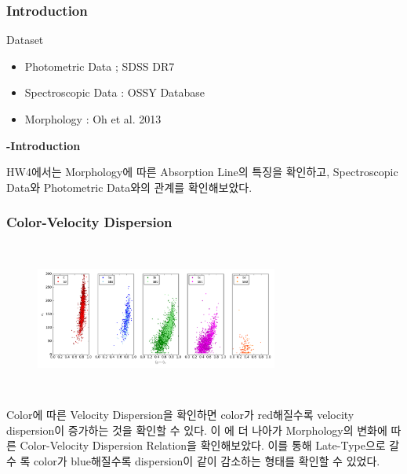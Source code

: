 \documentclass[xcolor={dvipsnames,table}]{beamer}
\newcommand\NM{\fontsize{9}{7.2}\selectfont}
\newcommand\SSM{\fontsize{7}{7.2}\selectfont}
\begin{document}
\begin{frame}
  \frametitle{Introduction}
  \NM
  \begin{block}{Dataset}
  \begin{itemize}
   \item Photometric Data ; SDSS DR7
   \vspace{0.3cm}
   \item Spectroscopic Data : OSSY Database
   \vspace{0.3cm}
   \item Morphology : Oh et al. 2013
  \end{itemize}
  \end{block}
  \vspace{0.3cm}
  \textbf{-Introduction}
  \vspace{0.2cm}
  
\hspace{0.3cm}HW4에서는 Morphology에 따른 Absorption Line의 특징을 확인하고,
Spectroscopic Data와 Photometric Data와의 관계를 확인해보았다.
\end{frame}

\begin{frame}
 \frametitle{Color-Velocity Dispersion}
 \SSM
 \begin{figure}
    \centering
    \includegraphics[width=8cm, height=5cm]{colorsigma.png}
 \end{figure}
\vspace{0.2cm}
Color에 따른 Velocity Dispersion을 확인하면 color가 red해질수록 velocity dispersion이 증가하는 것을 확인할 수 있다. 이
에 더 나아가 Morphology의 변화에 따른 Color-Velocity Dispersion Relation을 확인해보았다. 이를 통해 Late-Type으로 갈수
록 color가 blue해질수록 dispersion이 같이 감소하는 형태를 확인할 수 있었다.
\end{frame}
\end{document}
